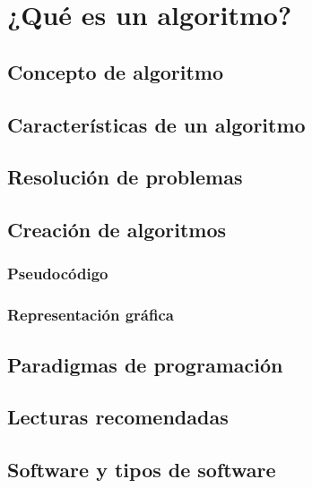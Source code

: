 
\chapter{¿Qué es un algoritmo?}

\section{Concepto de algoritmo}

\section{Características de un algoritmo}

\section{Resolución de problemas}

\section{Creación de algoritmos}

\subsection{Pseudocódigo}

\subsection{Representación gráfica}

\section{Paradigmas de programación}

\section{Lecturas recomendadas}

\section{Software y tipos de software}

